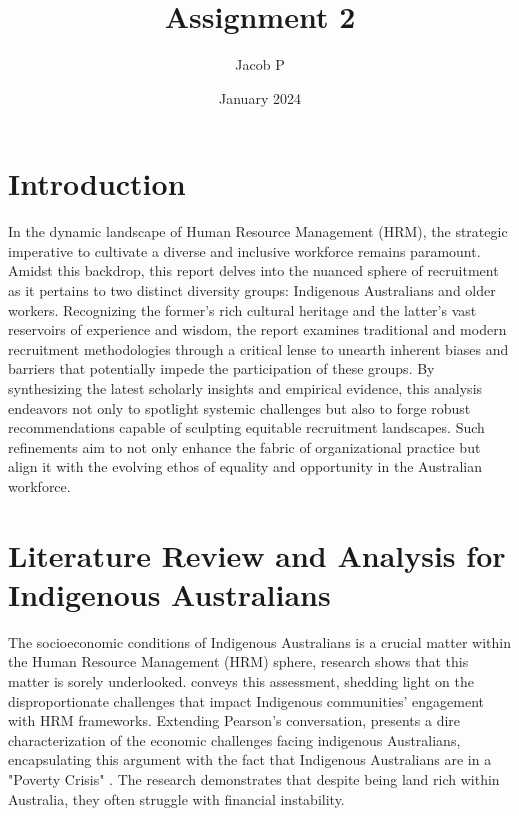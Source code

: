 \documentclass{article}
\title{Assignment 2}
\author{Jacob P }
\date{January 2024}
\begin{document}
\maketitle

\section{Introduction}
In the dynamic landscape of Human Resource Management (HRM), the strategic imperative to cultivate a diverse and inclusive workforce remains paramount. Amidst this backdrop, this report delves into the nuanced sphere of recruitment as it pertains to two distinct diversity groups: Indigenous Australians and older workers. Recognizing the former's rich cultural heritage and the latter's vast reservoirs of experience and wisdom, the report examines traditional and modern recruitment methodologies through a critical lense to unearth inherent biases and barriers that potentially impede the participation of these groups. By synthesizing the latest scholarly insights and empirical evidence, this analysis endeavors not only to spotlight systemic challenges but also to forge robust recommendations capable of sculpting equitable recruitment landscapes. Such refinements aim to not only enhance the fabric of organizational practice but align it with the evolving ethos of equality and opportunity in the Australian workforce.

\clearpage
\section{Literature Review and Analysis for Indigenous Australians}
The socioeconomic conditions of Indigenous Australians is a crucial matter within the Human Resource Management (HRM) sphere, research shows that this matter is sorely underlooked. \textcite{pearsonExtendingBoundariesHuman2011} conveys this assessment, shedding light on the disproportionate challenges that impact Indigenous communities' engagement with HRM frameworks. Extending Pearson's conversation, \cite{podgerEnduringChallengesNew2017} presents a dire characterization of the economic challenges facing indigenous Australians, encapsulating this argument with the fact that Indigenous Australians are in a "Poverty Crisis" \parencite{podgerEnduringChallengesNew2017}. The research demonstrates that despite being land rich within Australia, they often struggle with financial instability.
\end{document}

